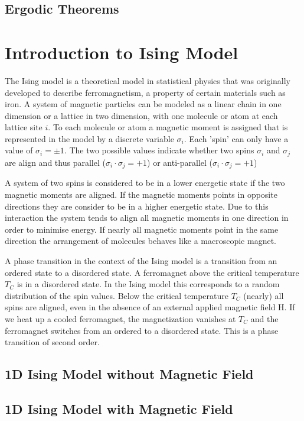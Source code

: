 \documentclass{article}
\theoremstyle{definition}
\begin{document}
\subsection{Ergodic Theorems}

\section{Introduction to Ising Model}
The Ising model is a theoretical model in statistical physics that was originally developed
to describe ferromagnetism, a property of certain materials such as iron. A system of magnetic particles can be modeled as a linear
chain in one dimension or a lattice in two dimension, with one molecule or atom at each
lattice site $i$. To each molecule or atom a magnetic moment is assigned that is represented
in the model by a discrete variable $\sigma_i$. Each 'spin' can only have a value of $\sigma_i = \pm 1$.
The two possible values indicate whether two spins $\sigma_i$ and $\sigma_j$ are align and thus parallel
($\sigma_i \cdot \sigma_j = +1$) or anti-parallel ($\sigma_i \cdot \sigma_j = +1$)

A system of two spins is considered to be in a lower energetic state if the two magnetic
moments are aligned. If the magnetic moments points in opposite directions they are
consider to be in a higher energetic state. Due to this interaction the system tends to
align all magnetic moments in one direction in order to minimise energy. If nearly all
magnetic moments point in the same direction the arrangement of molecules behaves like
a macroscopic magnet.

A phase transition in the context of the Ising model is a transition from an ordered state
to a disordered state. A ferromagnet above the critical temperature $T_C$ is in a disordered
state. In the Ising model this corresponds to a random distribution of the spin values.
Below the critical temperature $T_C$ (nearly) all spins are aligned, even in the absence of an
external applied magnetic field H. If we heat up a cooled ferromagnet, the magnetization
vanishes at $T_C$ and the ferromagnet switches from an ordered to a disordered state. This
is a phase transition of second order.

\subsection{1D Ising Model without Magnetic Field}

\subsection{1D Ising Model with Magnetic Field}
\end{document}
